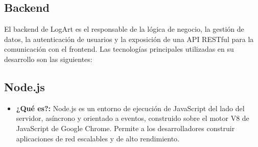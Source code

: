 \subsection{Backend}
\label{sec:backendTech}

El backend de LogArt es el responsable de la lógica de negocio, la gestión de datos, la autenticación de usuarios y la exposición de una API RESTful para la comunicación con el frontend. Las tecnologías principales utilizadas en su desarrollo son las siguientes:

\subsection{Node.js}
\label{sec:nodejs}

\begin{itemize}
    \item \textbf{¿Qué es?:} Node.js es un entorno de ejecución de JavaScript del lado del servidor, asíncrono y orientado a eventos, construido sobre el motor V8 de JavaScript de Google Chrome. Permite a los desarrolladores construir aplicaciones de red escalables y de alto rendimiento. \cite{kinstaQueEsNodeJS}


\end{itemize}
